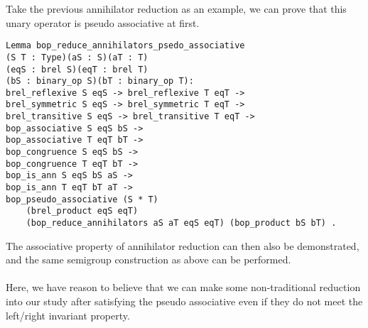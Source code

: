 \documentclass[a4paper,12pt,twoside,openright]{report}
\begin{document}
Take the previous annihilator reduction as an example, we can prove that this unary operator is pseudo associative at first.
\begin{lstlisting}
Lemma bop_reduce_annihilators_psedo_associative 
(S T : Type)(aS : S)(aT : T)
(eqS : brel S)(eqT : brel T)
(bS : binary_op S)(bT : binary_op T): 
brel_reflexive S eqS -> brel_reflexive T eqT ->
brel_symmetric S eqS -> brel_symmetric T eqT ->
brel_transitive S eqS -> brel_transitive T eqT -> 
bop_associative S eqS bS ->
bop_associative T eqT bT -> 
bop_congruence S eqS bS ->
bop_congruence T eqT bT -> 
bop_is_ann S eqS bS aS ->
bop_is_ann T eqT bT aT ->
bop_pseudo_associative (S * T) 
	(brel_product eqS eqT) 
	(bop_reduce_annihilators aS aT eqS eqT) (bop_product bS bT) .
\end{lstlisting}
The associative property of annihilator reduction can then also be demonstrated, and the same semigroup construction as above can be performed.\\\\
Here, we have reason to believe that we can make some non-traditional reduction into our study after satisfying the pseudo associative even if they do not meet the left/right invariant property.
\end{document}
